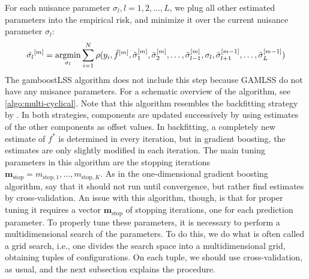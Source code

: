 For each nuisance parameter $\sigma_l, l=1,2,\ldots,L$, we plug all other estimated parameters into the empirical risk, and minimize it over the current nuisance parameter $\sigma_l$:
\begin{equation}
    \hat{\sigma_l}^{[m]}=\operatorname*{argmin}_{\sigma_l} \sum_{i=1}^N \rho(y_i,\hat{f}^{[m]},\hat{\sigma}_1^{[m]},\hat{\sigma}_2^{[m]},\ldots,
    \hat{\sigma}_{l-1}^{[m]},\sigma_l,\hat{\sigma}_{l+1}^{[m-1]},\ldots,\hat{\sigma}_L^{[m-1]})
\end{equation}
The gamboostLSS algorithm \citep{gamboostlss-paper} does not include this step because GAMLSS do not have any nuisance parameters.
For a schematic overview of the algorithm, see \eqref{algo:multi-cyclical}. Note that this algorithm resembles the backfitting strategy by \citet{hastie1986}.
In both strategies, components are updated successively by using estimates of the other components as offset values. In backfitting, a completely new estimate of $f^*$ is determined in every iteration, but in gradient boosting, the estimates are only slightly modified in each iteration.
The main tuning parameters in this algorithm are the stopping iterations $\mathbf{m}_{\text{stop}}=m_{\text{stop},1},\ldots,m_{\text{stop},K}$. As in the one-dimensional gradient boosting algorithm, \citet{schmid} say that it should not run until convergence, but rather find estimates by cross-validation. An issue with this algorithm, though, is that for proper tuning it requires a vector $\mathbf{m}_{\text{stop}}$ of stopping iterations, one for each prediction parameter. To properly tune these parameters, it is necessary to perform a multidimensional search of the parameters. To do this, we do what is often called a grid search, i.e., one divides the search space into a multidimensional grid, obtaining tuples of configurations. On each tuple, we should use cross-validation, as usual, and the next subsection explains the procedure.
